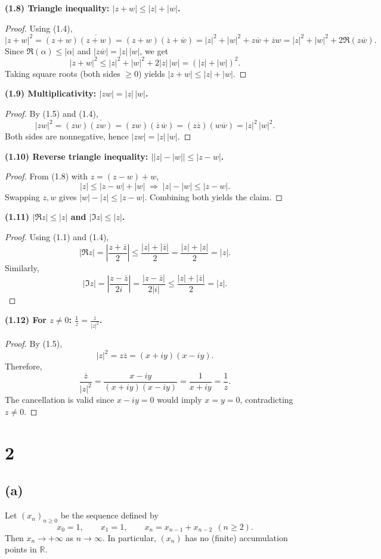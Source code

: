 \documentclass[12pt,a4paper]{article}
\theoremstyle{definition}
\theoremstyle{remark}
\begin{document}
\noindent\textbf{(1.8) Triangle inequality: $|z+w|\le |z|+|w|$.}
\begin{proof}
Using (1.4),
\[
|z+w|^2=(z+w)\overline{(z+w)}=(z+w)(\overline{z}+\overline{w})
=|z|^2+|w|^2+z\overline{w}+\overline{z}w
=|z|^2+|w|^2+2\Re(z\overline{w}).
\]
Since $\Re(\alpha)\le |\alpha|$ and $|z\overline{w}|=|z|\,|w|$, we get
\[
|z+w|^2 \le |z|^2+|w|^2+2|z|\,|w|=(|z|+|w|)^2.
\]
Taking square roots (both sides $\ge 0$) yields $|z+w|\le |z|+|w|$.
\end{proof}

\noindent\textbf{(1.9) Multiplicativity: $|zw|=|z|\,|w|$.}
\begin{proof}
By (1.5) and (1.4),
\[
|zw|^2=(zw)\overline{(zw)}=(zw)(\overline{z}\,\overline{w})
=(z\overline{z})(w\overline{w})=|z|^2\,|w|^2.
\]
Both sides are nonnegative, hence $|zw|=|z|\,|w|$.
\end{proof}

\noindent\textbf{(1.10) Reverse triangle inequality: $\big||z|-|w|\big|\le |z-w|$.}
\begin{proof}
From (1.8) with $z=(z-w)+w$,
\[
|z|\le |z-w|+|w|\;\Rightarrow\; |z|-|w|\le |z-w|.
\]
Swapping $z,w$ gives $|w|-|z|\le |z-w|$. Combining both yields the claim.
\end{proof}

\noindent\textbf{(1.11) $|\Re z|\le |z|$ and $|\Im z|\le |z|$.}
\begin{proof}
Using (1.1) and (1.4),
\[
|\Re z|=\left|\frac{z+\overline{z}}{2}\right|
\le \frac{|z|+|\overline{z}|}{2}=\frac{|z|+|z|}{2}=|z|.
\]
Similarly,
\[
|\Im z|=\left|\frac{z-\overline{z}}{2i}\right|
=\frac{|z-\overline{z}|}{2|i|}
\le \frac{|z|+|\overline{z}|}{2}=|z|.
\]
\end{proof}

\noindent\textbf{(1.12) For $z\ne 0$: $\displaystyle \frac{1}{z}=\frac{\overline{z}}{|z|^2}$.}
\begin{proof}
By (1.5), 
\[
|z|^2=z\overline{z}=(x+iy)(x-iy).
\]
Therefore,
\[
\frac{\overline{z}}{|z|^2}
=\frac{x-iy}{(x+iy)(x-iy)}
=\frac{1}{x+iy}
=\frac{1}{z}.
\]
The cancellation is valid since $x-iy=0$ would imply $x=y=0$, contradicting $z\ne 0$.
\end{proof}

\section*{2}
\subsection*{(a)}
Let $(x_n)_{n\ge 0}$ be the sequence defined by
\[
x_0 = 1,\qquad x_1 = 1,\qquad x_n = x_{n-1} + x_{n-2}\ \ (n\ge 2).
\]
Then $x_n\to +\infty$ as $n\to\infty$. In particular, $(x_n)$ has no (finite) accumulation points in $\mathbb{R}$.
\end{document}

